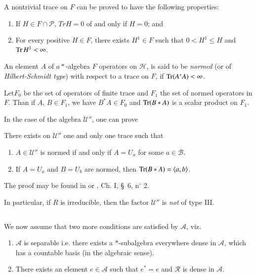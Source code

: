 A nontrivial trace on $F$ can be proved to have the following properties:
\begin{enumerate}
\item If $H\in F \cap \mathscr{P}$, $Tr H=0$ of and only if $H=0$; and 

\item For every positive $H \in F$, there exists $H^1\in F$ such that
  $0<H^{1}\leq H$ and $\operatorname{Tr} H^1<\infty$. 
\end{enumerate} 

\begin{defi*}%
 An element $A$ of $a*$-algebra  $F$ operators on $\mathscr{H}$, is
 said to be {\em normed} (or of {\em Hilbert-Schmidt type}) with
 respect to a trace on $F$, if $\operatorname{Tr}(A^*A)<\infty$. 
\end{defi*}

Let\pageoriginale $F_0$ be the set of operators of finite trace and
$F_1$ the set of 
normed operators in $F$. Than if $A$, $B\in F_1$, we have $B^*A\in F_0$
and $\operatorname{Tr} (B*A)$ is a scalar product on $F_1$. 

In the case of the algebra $\mathcal{U}''$, one can prove  

\begin{thm}\label{partIII-chap3-thm2}%
There exists on $\mathcal{U}''$ one and only one trace such that 
\begin{enumerate}
\renewcommand{\theenumi}{\alph{enumi}}
\renewcommand{\labelenumi}{\rm(\theenumi)}
\item  $A\in \mathcal{U}''$ is normed if and only if $A=U_a$ for some
  $a \in  \mathscr{B}$. 

\item If $A= U_a$ and $B=U_b$ are normed, then $\operatorname{Tr}(B*A)= \langle
  a,b \rangle$. 
\end{enumerate}
\end{thm}

The proof may be found in \cite{key23} or \cite{key12}, Ch. I, \S\ 6,
n$^\circ$ 2.  


In particular, if $R$ is irreducible, then the factor $\mathcal{U}''$ is  
\textit{not} of type III. 


\subsection{}\label{partIII-chap3-sec3.5}%


We now assume that two more conditions are satisfied by $\mathcal{A}$,
viz.
\begin{enumerate}
\renewcommand{\labelenumi}{(\theenumi)}
\item $\mathcal{A}$ is separable i.e. there exists a $*$-subalgebra
  everywhere dense in $\mathcal{A}$, which has a countable basis (in
  the algebraic sense). 

\item There exists an element $e\in \mathcal{A}$ such that $e^*=e$ and
  $\mathscr{R}$ is dense in $\mathcal{A}$. 
\end{enumerate}

